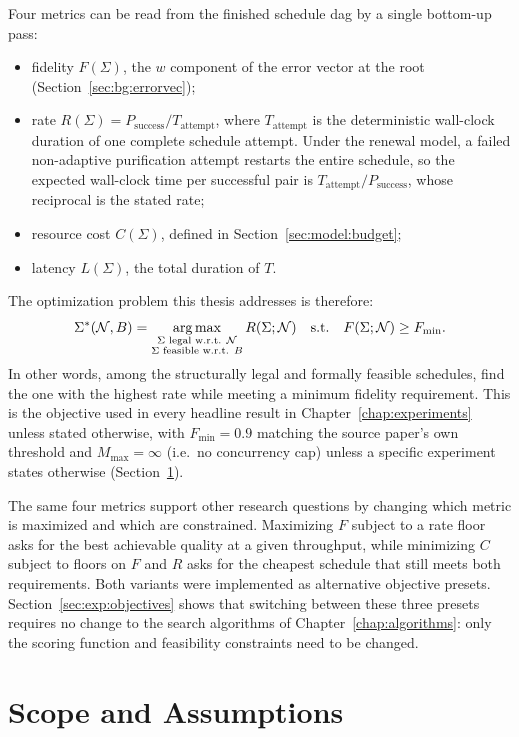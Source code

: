 Four metrics can be read from the finished schedule \Gls{dag} by a single bottom-up pass:
\begin{itemize}
    \item fidelity $F(\Sigma)$, the $w$ component of the error vector at the root (Section~\ref{sec:bg:errorvec});
    \item rate $R(\Sigma) = P_{\mathrm{success}} / T_{\mathrm{attempt}}$, where $T_{\mathrm{attempt}}$ is the deterministic wall-clock duration of one complete schedule attempt. Under the renewal model, a failed non-adaptive purification attempt restarts the entire schedule, so the expected wall-clock time per successful pair is $T_{\mathrm{attempt}}/P_{\mathrm{success}}$, whose reciprocal is the stated rate;
    \item resource cost $C(\Sigma)$, defined in Section~\ref{sec:model:budget};
    \item latency $L(\Sigma)$, the total duration of $T$.
\end{itemize}

The optimization problem this thesis addresses is therefore:
\[
    \Sigma^{*}(\mathcal{N}, B) =
    \operatorname*{arg\,max}_{\substack{\Sigma \text{ legal w.r.t. } \mathcal{N}\\
    \Sigma \text{ feasible w.r.t. } B}}
    R(\Sigma;\mathcal{N})
    \quad \text{s.t.} \quad
    F(\Sigma;\mathcal{N}) \ge F_{\min}.
\]
In other words, among the structurally legal and formally feasible schedules, find the one with the highest rate while meeting a minimum fidelity requirement. This is the objective used in every headline result in Chapter~\ref{chap:experiments} unless stated otherwise, with $F_{\min}=0.9$ matching the source paper's own threshold and $M_{\max}=\infty$ (i.e.\ no concurrency cap) unless a specific experiment states otherwise (Section~\ref{sec:model:scope}).

The same four metrics support other research questions by changing which metric is maximized and which are constrained. Maximizing $F$ subject to a rate floor asks for the best achievable quality at a given throughput, while minimizing $C$ subject to floors on $F$ and $R$ asks for the cheapest schedule that still meets both requirements. Both variants were implemented as alternative objective presets. Section~\ref{sec:exp:objectives} shows that switching between these three presets requires no change to the search algorithms of Chapter~\ref{chap:algorithms}: only the scoring function and feasibility constraints need to be changed.

\section{Scope and Assumptions}
\label{sec:model:scope}

